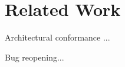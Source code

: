 \section{Related Work}

Architectural conformance ...

Bug reopening...~\cite{Zimmermann2012,Shihab2012b,Park2012,Almossawi2012}
